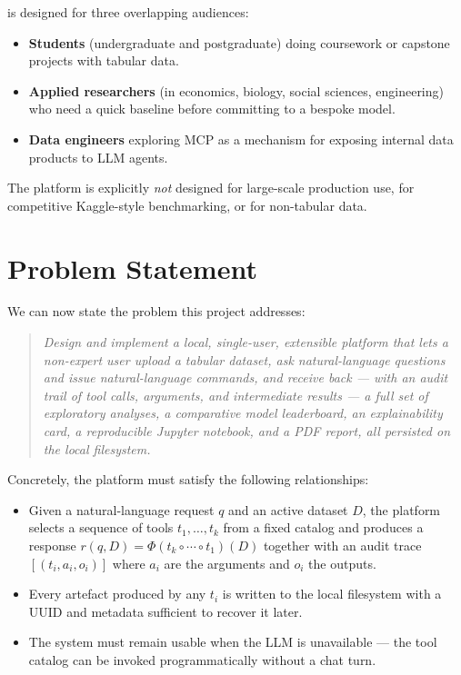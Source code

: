 \projname{} is designed for three overlapping audiences:

\begin{itemize}[leftmargin=1.4em]
  \item \textbf{Students} (undergraduate and postgraduate) doing
        coursework or capstone projects with tabular data.
  \item \textbf{Applied researchers} (in economics, biology, social
        sciences, engineering) who need a quick baseline before
        committing to a bespoke model.
  \item \textbf{Data engineers} exploring MCP as a mechanism for
        exposing internal data products to LLM agents.
\end{itemize}

The platform is explicitly \emph{not} designed for large-scale
production use, for competitive Kaggle-style benchmarking, or for
non-tabular data.

\section{Problem Statement}
\label{sec:formal-problem}

We can now state the problem this project addresses:

\begin{quote}
\emph{Design and implement a local, single-user, extensible platform
that lets a non-expert user upload a tabular dataset, ask
natural-language questions and issue natural-language commands, and
receive back --- with an audit trail of tool calls, arguments, and
intermediate results --- a full set of exploratory analyses, a
comparative model leaderboard, an explainability card, a reproducible
Jupyter notebook, and a PDF report, all persisted on the local
filesystem.}
\end{quote}

Concretely, the platform must satisfy the following relationships:

\begin{itemize}[leftmargin=1.4em]
  \item Given a natural-language request $q$ and an active dataset
        $D$, the platform selects a sequence of tools
        $t_1,\ldots,t_k$ from a fixed catalog and produces a response
        $r(q,D) = \Phi(t_k \circ \cdots \circ t_1)(D)$ together with
        an audit trace $[(t_i, a_i, o_i)]$ where $a_i$ are the
        arguments and $o_i$ the outputs.
  \item Every artefact produced by any $t_i$ is written to the local
        filesystem with a UUID and metadata sufficient to recover it
        later.
  \item The system must remain usable when the LLM is unavailable ---
        the tool catalog can be invoked programmatically without a
        chat turn.
\end{itemize}

